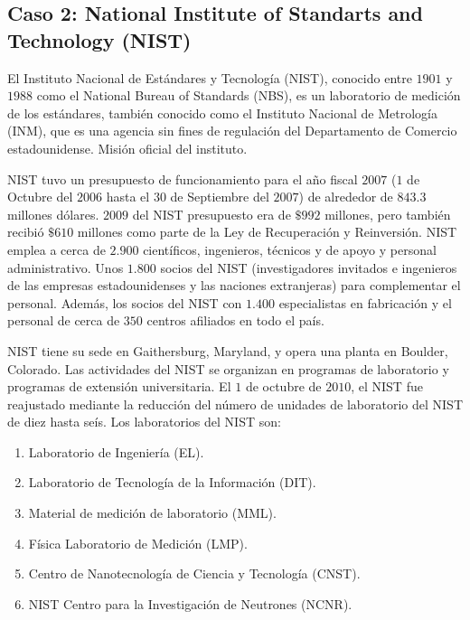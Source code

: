 \documentclass[titlepage,a4paper,twoside]{article}
\theoremstyle{definition}
\numberwithin{algorithm}{section}
\theoremstyle{remark}
\numberwithin{equation}{section}
\begin{document}
   
    \subsection{Caso 2: National Institute of Standarts and Technology (NIST)}
   
   
    El Instituto Nacional de Estándares y Tecnología (NIST), conocido entre $1901$ y $1988$ como el National Bureau of  Standards (NBS), es un laboratorio de medición de los estándares, también conocido como el Instituto Nacional de Metrología (INM), que es una agencia sin fines de regulación del Departamento de Comercio estadounidense. Misión oficial del instituto.
   
    NIST tuvo un presupuesto de funcionamiento para el año fiscal $2007$ ($1$ de Octubre del $2006$ hasta el $30$ de Septiembre del $2007$) de alrededor de $843.3$ millones dólares. $2009$ del NIST presupuesto era de $\$992$ millones, pero también recibió $\$610$ millones como parte de la Ley de Recuperación y Reinversión. NIST emplea a cerca de $2.900$ científicos, ingenieros, técnicos y de apoyo y personal administrativo. Unos $1.800$ socios del NIST (investigadores invitados e ingenieros de las empresas estadounidenses y las naciones extranjeras) para complementar el personal. Además, los socios del NIST con $1.400$ especialistas en fabricación y el personal de cerca de $350$ centros afiliados en todo el país.
   
    NIST tiene su sede en Gaithersburg, Maryland, y opera una planta en Boulder, Colorado. Las actividades del NIST se organizan en programas de laboratorio y programas de extensión universitaria. El $1$ de octubre de $2010$, el NIST fue reajustado mediante la reducción del número de unidades de laboratorio del NIST de diez hasta seís. Los laboratorios del NIST son:
    
    \begin{enumerate}
    	\item Laboratorio de Ingeniería (EL).
    	\item Laboratorio de Tecnología de la Información (DIT). 
    	\item Material de medición de laboratorio (MML). 
    	\item Física Laboratorio de Medición (LMP).
    	\item Centro de Nanotecnología de Ciencia y Tecnología (CNST).
    	\item NIST Centro para la Investigación de Neutrones (NCNR).
    \end{enumerate}
   
\end{document}
